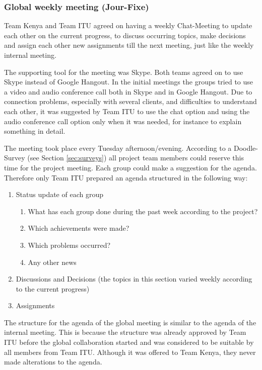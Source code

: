 
\subsubsection {Global weekly meeting (Jour-Fixe)}
\label{sec:global_meeting}
Team Kenya and Team ITU agreed on having a weekly Chat-Meeting to update each other on the current progress, to discuss occurring topics, make decisions and assign each other new assignments till the next meeting, just like the weekly internal meeting.

The supporting tool for the meeting was Skype. Both teams agreed on to use Skype instead of Google Hangout. In the initial meetings the groups tried to use a video and audio conference call both in Skype and in Google Hangout. Due to connection problems, especially with several clients, and difficulties to understand each other, it was suggested by Team ITU to use the chat option and using the audio conference call option only when it was needed, for instance to explain something in detail.

The meeting took place every Tuesday afternoon/evening. According to a Doodle-Survey (see Section \ref{sec:surveys}) all project team members could reserve this time for the project meeting. Each group could make a suggestion for the agenda. Therefore only Team ITU prepared an agenda structured in the following way:

	\begin{enumerate}
		\item Status update of each group
			\begin{enumerate}
				\item What has each group done during the past week according to the project?
				\item Which achievements were made?	
				\item Which problems occurred?
				\item Any other news
			\end{enumerate}
		\item Discussions and Decisions (the topics in this section varied weekly according to the current progress)
		\item Assignments
	\end{enumerate}

The structure for the agenda of the global meeting is similar to the agenda of the internal meeting. This is because the structure was already approved by Team ITU before the global collaboration started and was considered to be suitable by all members from Team ITU. Although it was offered to Team Kenya, they never made alterations to the agenda.

